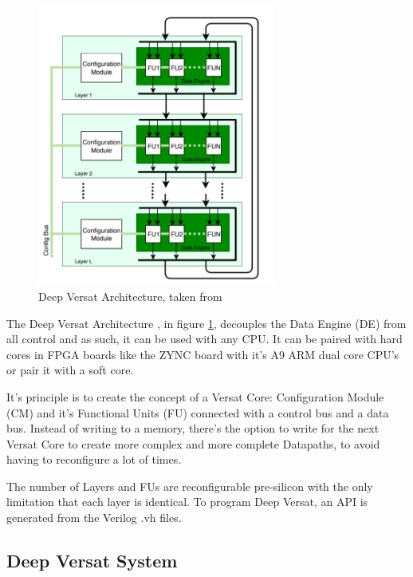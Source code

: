 \begin{figure}[!htb]
    \centering
    \includegraphics[width=0.7\textwidth]{Figures/deep-versat.png}
    \caption{Deep Versat Architecture, taken from~\cite{valter:deepversat}}
    \label{figure:deepversatarch}
\end{figure} 

\quad The Deep Versat Architecture\cite{valter:deepversat}
, in figure \ref{figure:deepversatarch}, decouples the Data Engine (DE) from all control and as such, it can be used with any CPU. 
It can be paired with hard cores in
FPGA boards like the ZYNC board %
with it's A9 ARM dual core CPU's or pair it with a soft core.

It's principle is to create the concept of a Versat Core: Configuration Module (CM) and it's Functional Units (FU) connected with a control bus and a data bus.
Instead of writing to a memory, there's the option to write for the next
Versat Core to create more complex and more complete Datapaths, to avoid
having to reconfigure a lot of times.

The number of Layers and FUs are reconfigurable pre-silicon with the only limitation
that each layer is identical. To program Deep Versat, an API is generated
from the Verilog .vh files. 




\newpage
\subsection{Deep Versat System}

